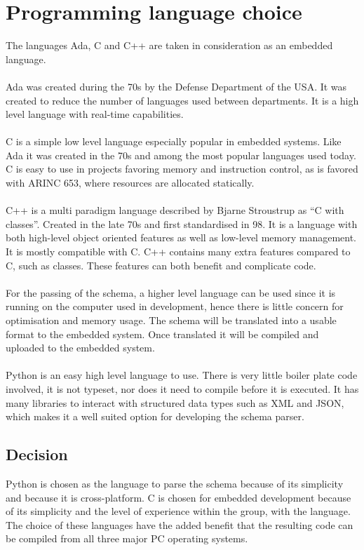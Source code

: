 \section{Programming language choice}
The languages Ada, C and C++ are taken in consideration as an embedded language.
\\\\
Ada was created during the 70\textquotesingle{}s by the Defense Department of the USA.
It was created to reduce the number of
languages used between departments.
It is a high level language with real-time capabilities.
\\\\
C is a simple low level language especially popular in embedded systems.
Like Ada it was created in the 70\textquotesingle{}s and
among the most popular languages used today.
C is easy to use in projects favoring memory and instruction control,
as is favored with ARINC 653,
where resources are allocated statically.
\\\\
C++ is a multi paradigm language described by Bjarne Stroustrup as ``C with classes''\cite{c_classes}.
Created in the late 70\textquotesingle{}s and first standardised in 98. It
is a language with both high-level object oriented features as well as low-level
memory management. It is mostly compatible with C. C++ contains many extra
features compared to C, such as classes. These features can both benefit and complicate
code.
\\\\
For the passing of the schema, a higher level language can be used
since it is running on the computer used in development,
hence there is little concern for optimisation and memory usage.
The schema will be translated into a usable format to the embedded system.
Once translated it will be compiled and uploaded to the
embedded system.
\\\\
Python is an easy high level language to use.
There is very little boiler plate code involved,
it is not typeset, nor does it need to compile
before it is executed.
It has many libraries to interact with structured
data types such as XML and JSON,
which makes it a well suited option for developing the schema parser.

\subsection{Decision}
Python is chosen as the language to parse the schema because of its simplicity
and because it is cross-platform.
C is chosen for embedded development because of its simplicity and
the level of experience within the group, with the language.\\
The choice of these languages have the added benefit that the resulting code can be compiled
from all three major PC operating systems.
